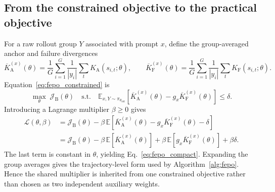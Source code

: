 \documentclass{article}
\newcommand{\oldpol}{\pi_{\theta_{\mathrm{old}}}}
\newcommand{\E}{\mathbb{E}}
\begin{document}
\subsection{From the constrained objective to the practical objective}
For a raw rollout group $Y$ associated with prompt $x$, define the group-averaged anchor and failure divergences
\begin{equation}
\overline K_{\mathrm A}^{(x)}(\theta)=\frac1G\sum_{i=1}^{G}\frac1{|y_i|}\sum_t K_{\mathrm A}(s_{i,t};\theta),\qquad
\overline K_{\mathrm F}^{(x)}(\theta)=\frac1G\sum_{i=1}^{G}\frac1{|y_i|}\sum_t K_{\mathrm F}(s_{i,t};\theta).
\end{equation}
Equation~\eqref{eq:fepo_constrained} is
\begin{equation}
\max_\theta\;\mathcal J_{\mathrm B}(\theta)
\quad\text{s.t.}\quad
\E_{x,Y\sim\oldpol}\!\left[\overline K_{\mathrm A}^{(x)}(\theta)-g_x\overline K_{\mathrm F}^{(x)}(\theta)\right]\le\delta.
\end{equation}
Introducing a Lagrange multiplier $\beta\ge0$ gives
\begin{align}
\mathcal L(\theta,\beta)
&=\mathcal J_{\mathrm B}(\theta)
-\beta\,\E\!\left[\overline K_{\mathrm A}^{(x)}(\theta)-g_x\overline K_{\mathrm F}^{(x)}(\theta)-\delta\right]\\
&=\mathcal J_{\mathrm B}(\theta)
-\beta\,\E\!\left[\overline K_{\mathrm A}^{(x)}(\theta)\right]
+\beta\,\E\!\left[g_x\overline K_{\mathrm F}^{(x)}(\theta)\right]
+\beta\delta.
\end{align}
The last term is constant in $\theta$, yielding Eq.~\eqref{eq:fepo_compact}. Expanding the group averages gives the trajectory-level form used by Algorithm~\ref{alg:fepo}. Hence the shared multiplier is inherited from one constrained objective rather than chosen as two independent auxiliary weights.
\end{document}
